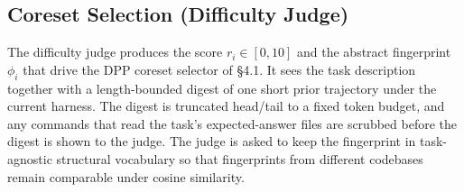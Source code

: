 \documentclass{llmxive}
\begin{document}
\subsection{Coreset Selection (Difficulty Judge)}

The difficulty judge produces the score $r_i \in [0, 10]$ and the
abstract fingerprint $\phi_i$ that drive the DPP coreset selector of
\S 4.1. It sees the task description together with a length-bounded
digest of one short prior trajectory under the current harness. The
digest is truncated head/tail to a fixed token budget, and any
commands that read the task's expected-answer files are scrubbed
before the digest is shown to the judge. The judge is asked to keep
the fingerprint in task-agnostic structural vocabulary so that
fingerprints from different codebases remain comparable under cosine
similarity.
\end{document}
